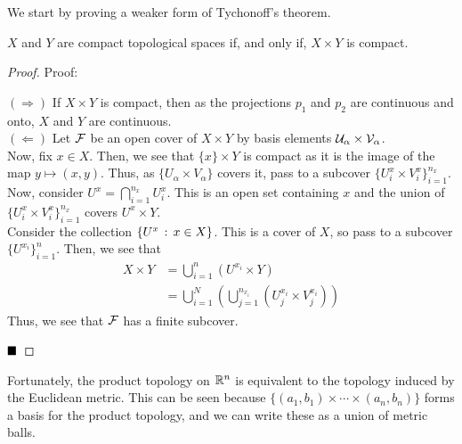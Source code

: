
We start by proving a weaker form of Tychonoff's theorem.

\begin{theorem}
    $X$ and $Y$ are compact topological spaces if, and only if, $X \times Y$ is compact.
\end{theorem}
\begin{proof}{Proof:}

    $(\Rightarrow)$ If $X \times Y$ is compact, then as the projections $p_1$ and $p_2$ are continuous and onto, $X$ and $Y$ are continuous.\\

    $(\Leftarrow)$ Let $\cal{F}$ be an open cover of $X \times Y$ by basis elements $\cal{U}_{\alpha} \times \cal{V}_{\alpha}$.\\

    Now, fix $x \in X$. Then, we see that $\{x\} \times Y$ is compact as it is the image of the map $y \mapsto (x, y)$. Thus, as $\{U_{\alpha} \times V_{\alpha}\}$ covers it, pass to a subcover $\{U_{i}^x \times V_{i}^{x}\}_{i = 1}^{n_{x}}$.\\

    Now, consider $U^{x} = \bigcap_{i = 1}^{n_{x}}U_{i}^{x}$. This is an open set containing $x$ and the union of $\{U_{i}^{x} \times V_{i}^{x}\}_{i = 1}^{n_{x}}$ covers $U^{x} \times Y$.\\

    Consider the collection $\{U^{x} \col x \in X\}$. This is a cover of $X$, so pass to a subcover $\{U^{x_i}\}_{i = 1}^{n}$. Then, we see that
    \begin{align*}
        X \times Y &= \bigcup_{i = 1}^{n} (U^{x_i} \times Y)\\
        &= \bigcup_{i = 1}^{N}\left(\bigcup_{j = 1}^{n_{x_i}}\left(U_{j}^{x_i} \times V_{j}^{x_i}\right)\right) 
    \end{align*}
    Thus, we see that $\cal{F}$ has a finite subcover.

    $\qed$
\end{proof}

Fortunately, the product topology on $\R^n$ is equivalent to the topology induced by the Euclidean metric. This can be seen because $\{(a_1, b_1) \times \cdots \times (a_n, b_n)\}$ forms a basis for the product topology, and we can write these as a union of metric balls.

